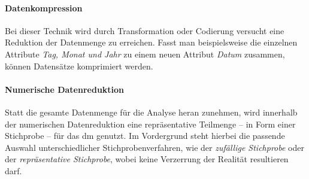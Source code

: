 \paragraph{Datenkompression}
\label{datenkompression}
Bei dieser Technik wird durch Transformation oder Codierung versucht eine Reduktion der Datenmenge zu erreichen. Fasst man beispielsweise die einzelnen Attribute \textit{Tag, Monat und Jahr} zu einem neuen Attribut \textit{Datum} zusammen, können Datensätze komprimiert werden.
 
\paragraph{Numerische Datenreduktion}
Statt die gesamte Datenmenge für die Analyse heran zunehmen, wird innerhalb der numerischen Datenreduktion eine repräsentative Teilmenge -- in Form einer Stichprobe -- für das \gls{dm} genutzt. Im Vordergrund steht hierbei die passende Auswahl unterschiedlicher Stichprobenverfahren, wie der \textit{zufällige Stichprobe} oder der \textit{repräsentative Stichprobe}, wobei keine Verzerrung der Realität resultieren darf.